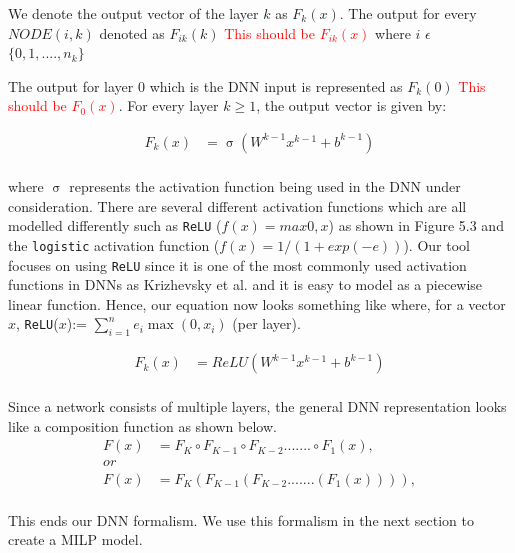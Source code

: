 We denote the output vector of the layer $k$ as $F_k(x)$.
The output for every $NODE(i,k)$ denoted as $F_{ik}(k)$ \textcolor{red}{This should be $F_{ik}(x)$} where $i$ $\epsilon$ $\{0,1,....,n_k\}$ 

The output for layer 0 which is the \ac{DNN} input is represented as $F_k(0)$ \textcolor{red}{This should be $F_{0}(x)$}.
For every layer $k \geq 1$, the output vector is given by: 

\begin{equation}
\begin{aligned}
F_k(x) &= \upsigma(W^{k-1}x^{k-1} + b^{k-1}) \\
\end{aligned}
\end{equation}

where $\upsigma$ represents the activation function being used in the DNN under consideration.
There are several different activation functions which are all modelled differently such as \texttt{ReLU} ($f(x) = max {0,x}$) as shown in Figure 5.3 and the \texttt{logistic} activation function ($f(x)=1/(1+ exp(-e))$).
Our tool focuses on using \texttt{ReLU} since it is one of the most commonly used activation functions in \ac{DNN}s as Krizhevsky et al. \cite{10.1145/3065386} and it is easy to model as a piecewise linear function. 
Hence, our equation now looks something like where, for a vector $x$, \texttt{ReLU}($x$):= $\sum_{i=1}^{n} e_{i}\max(0, x_{i})$ (per layer).

\begin{equation}
\begin{aligned}
F_k(x) &= ReLU(W^{k-1}x^{k-1} + b^{k-1}) \\
\end{aligned}
\end{equation}

Since a network consists of multiple layers, the general \ac{DNN} representation looks like a composition function as shown below. 
\begin{equation}
	\begin{aligned}
	F(x) &= F_K \circ F_{K-1} \circ F_{K-2} ....... \circ F_1(x),    \\
	or \\
	F(x) &= F_K ( F_{K-1}( F_{K-2} .......  (F_1(x)))),    \\
	\end{aligned}
\end{equation}

This ends our \ac{DNN} formalism. We use this formalism in the next section to create a \ac{MILP} model. 

